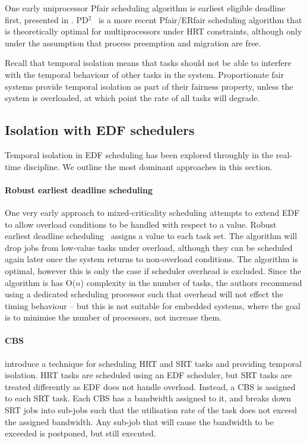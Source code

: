 One early uniprocessor Pfair scheduling algorithm is earliest eligible deadline first, presented in \citet{Stoica_AKBGP_96}.
PD$^{2}$~\citep{Srinivasan_Anderson_2006} is a more recent Pfair/ERfair scheduling algorithm that is theoretically optimal for multiprocessors under \gls{HRT} constraints, although only under the assumption that process preemption and migration are free.

Recall that temporal isolation means that tasks should not be able to interfere with the temporal behaviour of other tasks in the system.
Proportionate fair systems provide temporal isolation as part of their fairness property, unless the system is overloaded, at which point the rate of all tasks will degrade.

\subsection{Isolation with EDF schedulers}

Temporal isolation in \gls{EDF} scheduling has been explored throughly in the real-time discipline.
We outline the most dominant approaches in this section.

\paragraph{Robust earliest deadline scheduling}
One very early approach to mixed-criticality scheduling attempts to extend \gls{EDF} to allow overload conditions to be handled with respect to a value. Robust earliest deadline scheduling~\citep{Buttazzo_Stankovic_1993} assigns a value to each task set.
The algorithm will drop jobs from low-value tasks under overload, although they can be scheduled again later once the system returns to non-overload conditions.
The algorithm is optimal, however this is only the case if scheduler overhead is excluded.
Since the algorithm is has O($n$) complexity in the number of tasks, the authors recommend using a dedicated scheduling processor such that overhead will not effect the timing behaviour -- but this is not suitable for embedded systems, where the goal is to minimise the number of processors, not increase them.

\paragraph{\gls{CBS}} \citet{Abeni_Buttazzo_2004} introduce a technique for scheduling \gls{HRT} and \gls{SRT} tasks and providing temporal isolation.
\gls{HRT} tasks are scheduled using an \gls{EDF} scheduler, but \gls{SRT} tasks are treated differently as \gls{EDF} does not handle overload.
Instead, a \gls{CBS} is assigned to each \gls{SRT} task.
Each \gls{CBS} has a bandwidth assigned to it, and breaks down \gls{SRT} jobs into sub-jobs such that the utilisation rate of the task does not exceed the assigned bandwidth.
Any sub-job that will cause the bandwidth to be exceeded is postponed, but still executed.

